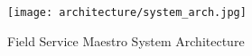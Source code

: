 \begin{figure}[ht]
	\centering
	\texttt{[image: architecture/system\_arch.jpg]}
	\caption{Field Service Maestro System Architecture}
\end{figure}
